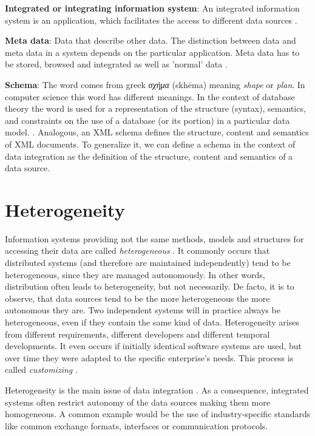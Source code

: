\textbf{Integrated or integrating information system}:\label{integrated_system_index} An integrated information system is an application, which facilitates the access to different data sources \cite[p. 7]{DBLP:books/dp/LeserN2006}.

\textbf{Meta data}:\label{meta_data_index} Data that describe other data. The distinction between data and meta data in a system depends on the particular application. Meta data has to be stored, browsed and integrated as well as 'normal' data \cite[p. 8]{DBLP:books/dp/LeserN2006}.

\textbf{Schema}:\label{schema_index} The word comes from greek \foreignlanguage{greek}{\emph{σχήμα}} (skhēma) meaning \emph{shape} or \emph{plan}. In computer science this word has different meanings. 
In the context of database theory the word is used for a representation of the structure (syntax), semantics, and constraints on the use of a database (or its portion) in a particular data model. \cite[p. 235]{Sheth:1990:FDS:96602.96604}. Analogous, an XML schema defines the structure, content and semantics of XML documents\cite{w3XMLSchema}. To generalize it, we can define a schema in the context of data integration as the definition of the structure, content and semantics of a data source.

\section{Heterogeneity}

Information systems providing not the same methods, models and structures for accessing their data are called \textit{heterogeneous} \cite[p. 58]{DBLP:books/dp/LeserN2006}. It commonly occurs that distributed systems (and therefore are maintained independently) tend to be heterogeneous, since they are managed autonomously. In other words, distribution often leads to heterogeneity, but not necessarily. De facto, it is to observe, that data sources tend to be the more heterogeneous the more autonomous they are. Two independent systems will in practice always  be heterogeneous, even if they contain the same kind of data. Heterogeneity arises from different requirements, different developers and different temporal developments. It even occurs if initially identical software systems are used, but over time they were adapted to the specific enterprise's needs. This process is called \textit{customizing}  \cite[p. 59]{DBLP:books/dp/LeserN2006}. 

Heterogeneity is the main issue of data integration \cite[p. 59]{DBLP:books/dp/LeserN2006}. As a consequence, integrated systems often restrict autonomy of the data sources making them more homogeneous. A common example would be the use of industry-specific standards like common exchange formats, interfaces or communication protocols.

